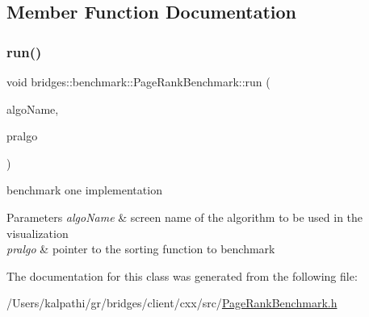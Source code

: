 \subsection{Member Function Documentation}
\mbox{\label{classbridges_1_1benchmark_1_1_page_rank_benchmark_a090873837a04f96bb0349471ffca7cfa}} 
\subsubsection{\texorpdfstring{run()}{run()}}
{\footnotesize\ttfamily void bridges\+::benchmark\+::\+Page\+Rank\+Benchmark\+::run (\begin{DoxyParamCaption}\item[{std\+::string}]{algo\+Name,  }\item[{void($\ast$)(const \mbox{\hyperlink{classbridges_1_1datastructure_1_1_graph_adj_list}{Graph\+Adj\+List}}$<$ std\+::string $>$ \&gr, std\+::unordered\+\_\+map$<$ std\+::string, double $>$ \&out)}]{pralgo }\end{DoxyParamCaption})\hspace{0.3cm}{\ttfamily [inline]}}



benchmark one implementation 


\begin{DoxyParams}{Parameters}
{\em algo\+Name} & screen name of the algorithm to be used in the visualization \\
\hline
{\em pralgo} & pointer to the sorting function to benchmark \\
\hline
\end{DoxyParams}


The documentation for this class was generated from the following file\+:\begin{DoxyCompactItemize}
\item 
/\+Users/kalpathi/gr/bridges/client/cxx/src/\mbox{\hyperlink{_page_rank_benchmark_8h}{Page\+Rank\+Benchmark.\+h}}\end{DoxyCompactItemize}
